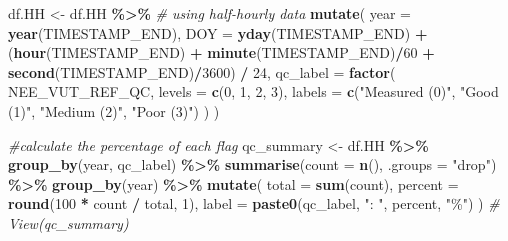 \documentclass[
]{article}
\newenvironment{Shaded}{\begin{snugshade}}{\end{snugshade}}
\newcommand{\AttributeTok}[1]{\textcolor[rgb]{0.13,0.29,0.53}{#1}}
\newcommand{\CommentTok}[1]{\textcolor[rgb]{0.56,0.35,0.01}{\textit{#1}}}
\newcommand{\DecValTok}[1]{\textcolor[rgb]{0.00,0.00,0.81}{#1}}
\newcommand{\FunctionTok}[1]{\textcolor[rgb]{0.13,0.29,0.53}{\textbf{#1}}}
\newcommand{\NormalTok}[1]{#1}
\newcommand{\OtherTok}[1]{\textcolor[rgb]{0.56,0.35,0.01}{#1}}
\newcommand{\SpecialCharTok}[1]{\textcolor[rgb]{0.81,0.36,0.00}{\textbf{#1}}}
\newcommand{\StringTok}[1]{\textcolor[rgb]{0.31,0.60,0.02}{#1}}
\begin{document}
\begin{Shaded}
\begin{Highlighting}[]
\NormalTok{df.HH }\OtherTok{\textless{}{-}}\NormalTok{ df.HH }\SpecialCharTok{\%\textgreater{}\%} \CommentTok{\# using half{-}hourly data}
  \FunctionTok{mutate}\NormalTok{(}
    \AttributeTok{year =} \FunctionTok{year}\NormalTok{(TIMESTAMP\_END),}
    \AttributeTok{DOY =} \FunctionTok{yday}\NormalTok{(TIMESTAMP\_END) }\SpecialCharTok{+} 
\NormalTok{      (}\FunctionTok{hour}\NormalTok{(TIMESTAMP\_END) }\SpecialCharTok{+} \FunctionTok{minute}\NormalTok{(TIMESTAMP\_END)}\SpecialCharTok{/}\DecValTok{60} \SpecialCharTok{+} \FunctionTok{second}\NormalTok{(TIMESTAMP\_END)}\SpecialCharTok{/}\DecValTok{3600}\NormalTok{) }\SpecialCharTok{/} \DecValTok{24}\NormalTok{,}
    \AttributeTok{qc\_label =} \FunctionTok{factor}\NormalTok{(}
\NormalTok{      NEE\_VUT\_REF\_QC,}
      \AttributeTok{levels =} \FunctionTok{c}\NormalTok{(}\DecValTok{0}\NormalTok{, }\DecValTok{1}\NormalTok{, }\DecValTok{2}\NormalTok{, }\DecValTok{3}\NormalTok{),}
      \AttributeTok{labels =} \FunctionTok{c}\NormalTok{(}\StringTok{"Measured (0)"}\NormalTok{, }\StringTok{"Good (1)"}\NormalTok{, }\StringTok{"Medium (2)"}\NormalTok{, }\StringTok{"Poor (3)"}\NormalTok{)}
\NormalTok{    )}
\NormalTok{  )}

\CommentTok{\#calculate the percentage of each flag}
\NormalTok{qc\_summary }\OtherTok{\textless{}{-}}\NormalTok{ df.HH }\SpecialCharTok{\%\textgreater{}\%}
  \FunctionTok{group\_by}\NormalTok{(year, qc\_label) }\SpecialCharTok{\%\textgreater{}\%}
  \FunctionTok{summarise}\NormalTok{(}\AttributeTok{count =} \FunctionTok{n}\NormalTok{(), }\AttributeTok{.groups =} \StringTok{"drop"}\NormalTok{) }\SpecialCharTok{\%\textgreater{}\%}
  \FunctionTok{group\_by}\NormalTok{(year) }\SpecialCharTok{\%\textgreater{}\%}
  \FunctionTok{mutate}\NormalTok{(}
    \AttributeTok{total =} \FunctionTok{sum}\NormalTok{(count),}
    \AttributeTok{percent =} \FunctionTok{round}\NormalTok{(}\DecValTok{100} \SpecialCharTok{*}\NormalTok{ count }\SpecialCharTok{/}\NormalTok{ total, }\DecValTok{1}\NormalTok{),}
    \AttributeTok{label =} \FunctionTok{paste0}\NormalTok{(qc\_label, }\StringTok{": "}\NormalTok{, percent, }\StringTok{"\%"}\NormalTok{)}
\NormalTok{  )}
\CommentTok{\# View(qc\_summary)}


\end{Highlighting}
\end{Shaded}
\end{document}
